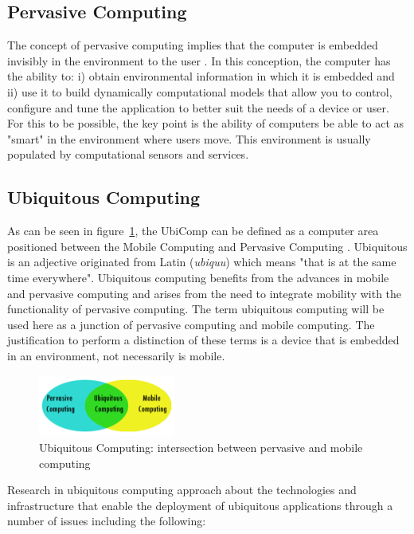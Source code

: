\documentclass{acm_proc_article-sp}
\begin{document}
\subsection{Pervasive Computing}
The concept of pervasive computing implies that the computer is embedded invisibly in the environment to the user \cite{krumm2009}. In this conception, the computer has the ability to: i) obtain environmental information in which it is embedded and ii) use it to build dynamically computational models that allow you to control, configure and tune the application to better suit the needs of a device or user. For this to be possible, the key point is the ability of computers be able to act as "smart" in the environment where users move. This environment is usually populated by computational sensors and services.

\subsection{Ubiquitous Computing}
As can be seen in figure~\ref{fig:ubiq}, the UbiComp can be defined as a computer area positioned between the Mobile Computing and Pervasive Computing \cite{de2003computaccao,krumm2009}. Ubiquitous is an adjective originated from Latin (\textit{ubiquu}) which means "that is at the same time everywhere". Ubiquitous computing benefits from the advances in mobile and pervasive computing and arises from the need to integrate mobility with the functionality of pervasive computing. The term ubiquitous computing will be used here as a junction of pervasive computing and mobile computing. The justification to perform a distinction of these terms is a device that is embedded in an environment, not necessarily is mobile.
\begin{figure}[h]
\centering
    \includegraphics[width=0.4\textwidth,natwidth=610,natheight=642]{pictures/ubiq.png}
    \caption{Ubiquitous Computing: intersection between pervasive and mobile computing}
    \label{fig:ubiq}
\end{figure}
\newline
\newline
Research in ubiquitous computing approach about the technologies and infrastructure that enable the deployment of ubiquitous applications through a number of issues including the following:
\end{document}

